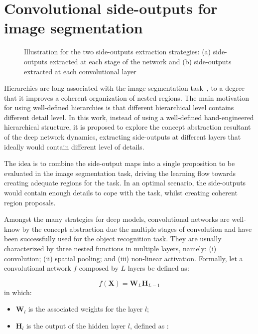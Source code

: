 \section{Convolutional side-outputs for image segmentation}
\label{sec:method}

\begin{figure*}[!t]
\centering
{}
\hfil
{}
\caption{Illustration for the two side-outputs extraction strategies:  (a) side-outputs extracted at each stage of the network and (b) side-outputs extracted at each convolutional layer}
\label{fig:extraction}
\end{figure*}

Hierarchies are long associated with the image segmentation task~\cite{jones97,cardelino06,najman12,xu16,cousty18}, to a degree that it improves a coherent organization of nested regions. The main motivation for using well-defined hierarchies is that different hierarchical level contains different detail level. In this work, instead of using a well-defined hand-engineered hierarchical structure, it is proposed to explore the concept abstraction resultant of the deep network dynamics, extracting side-outputs at different layers that ideally would contain different level of details. 


The idea is to combine the side-output maps into a single proposition to be evaluated in the image segmentation task, driving the learning flow towards creating adequate regions for the task. In an optimal scenario, the side-outputs would contain enough details to cope with the task, whilst creating coherent region proposals.

Amongst the many strategies for deep models, convolutional networks are well-know by the concept abstraction due the multiple stages of convolution and have been successfully used for the object recognition task. They are usually characterized by three nested functions in multiple layers, namely: (i) convolution; (ii) spatial pooling; and (iii) non-linear activation. Formally, let a convolutional network $\mathit{f}$ composed by $L$ layers be defined as:

\begin{equation}
\mathit{f}(\mathbf{X})=\mathbf{W}_L\mathbf{H}_{L-1}
\end{equation}
\noindent in which:
\begin{itemize}
\item $\mathbf{W}_l$ is the associated weights for the layer $l$;
\item $\mathbf{H}_l$ is the output of the hidden layer $l$, defined as \color{red}{Caso f (2) nao seja uma camada de saida da rede, ela eh chamada de camada intermediaria ou escondida (hidden layer) (BENGIO-GOODFELLOW). No caso, a formula deveria ser L-2.}:
\end{itemize}

